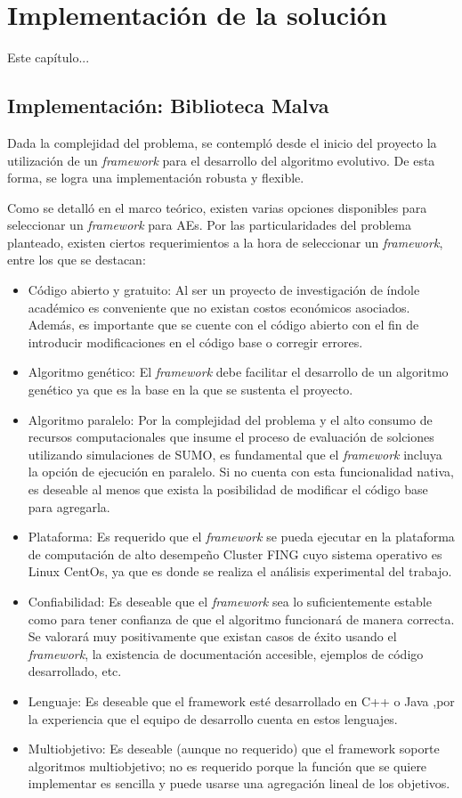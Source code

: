 \chapter{Implementación de la solución}

Este capítulo...


\section{Implementación: Biblioteca Malva}

Dada la complejidad del problema, se contempló desde el inicio del proyecto la utilización de un \emph{framework} para el desarrollo del algoritmo evolutivo. De esta forma, se logra una implementación robusta y flexible. 

Como se detalló en el marco teórico, existen varias opciones disponibles para seleccionar un \emph{framework} para AEs. Por las particularidades del problema planteado, existen ciertos requerimientos a la hora de seleccionar un \emph{framework}, entre los que se destacan:

\begin{itemize}
	\item Código abierto y gratuito: Al ser un proyecto de investigación de índole académico es conveniente que no existan costos económicos asociados. Además, es importante que se cuente con el código abierto con el fin de introducir modificaciones en el código base o corregir errores.
	\item Algoritmo genético: El \emph{framework} debe facilitar el desarrollo de un algoritmo genético ya que es la base en la que se sustenta el proyecto.
	\item Algoritmo paralelo: Por la complejidad del problema y el alto consumo de recursos computacionales que insume el proceso de evaluación de solciones utilizando simulaciones de SUMO, es fundamental que el \emph{framework} incluya la opción de ejecución en paralelo. Si no cuenta con esta funcionalidad nativa, es deseable al menos que exista la posibilidad de modificar el código base para agregarla.
	\item Plataforma: Es requerido que el \emph{framework} se pueda ejecutar en la plataforma de computación de alto desempeño Cluster FING cuyo sistema operativo es Linux CentOs, ya que es donde se realiza el análisis experimental del trabajo. 
	\item Confiabilidad: Es deseable que el \emph{framework} sea lo suficientemente estable como para tener confianza de que el algoritmo funcionará de manera correcta. Se valorará muy positivamente que existan casos de éxito usando el \emph{framework}, la existencia de documentación accesible, ejemplos de código desarrollado, etc.
	\item Lenguaje: Es deseable que el framework esté desarrollado en C++ o Java ,por la experiencia que el equipo de desarrollo cuenta en estos lenguajes. 
	\item Multiobjetivo: Es deseable (aunque no requerido) que el framework soporte algoritmos multiobjetivo; no es requerido porque la función que se quiere implementar es sencilla y puede usarse una agregación lineal de los objetivos.
\end{itemize} 

